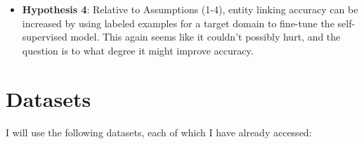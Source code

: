\documentclass{article}
\begin{document}
\begin{itemize}
  \item \textbf{Hypothesis 4}: Relative to Assumptions (1-4), entity linking accuracy can be increased by using labeled examples for a target domain to fine-tune the self-supervised model. This again seems like it couldn't possibly hurt, and the question is to what degree it might improve accuracy.


\end{itemize}

%


\section{Datasets}

I will use the following datasets, each of which I have already accessed:
\end{document}
